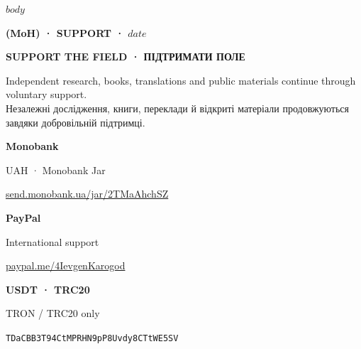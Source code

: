 \documentclass[10pt,a4paper]{article}
\begin{document}
\justifying
$body$
\clearpage
\thispagestyle{fancy}
{\fontsize{8}{10}\selectfont\bfseries\color{MoHMuted}(MoH) · SUPPORT · $date$\par}
\vspace{5mm}
{\fontsize{25}{28}\selectfont\bfseries\color{MoHInk}SUPPORT THE FIELD · ПІДТРИМАТИ ПОЛЕ\par}
\vspace{4mm}
{\fontsize{11}{15}\selectfont\color{MoHMuted}Independent research, books, translations and public materials continue through voluntary support.\\Незалежні дослідження, книги, переклади й відкриті матеріали продовжуються завдяки добровільній підтримці.\par}
\vspace{9mm}
\noindent\begin{minipage}[t]{0.30\linewidth}\centering
{\bfseries Monobank}\par\vspace{4mm}\color{black}\par\vspace{4mm}
{\fontsize{7.6}{10}\selectfont UAH · Monobank Jar\par}
{\fontsize{7.3}{9}\selectfont\href{https://send.monobank.ua/jar/2TMaAhchSZ}{send.monobank.ua/jar/2TMaAhchSZ}\par}
\end{minipage}\hfill
\begin{minipage}[t]{0.30\linewidth}\centering
{\bfseries PayPal}\par\vspace{4mm}\color{black}\par\vspace{4mm}
{\fontsize{7.6}{10}\selectfont International support\par}
{\fontsize{7.3}{9}\selectfont\href{https://www.paypal.me/4IevgenKarogod}{paypal.me/4IevgenKarogod}\par}
\end{minipage}\hfill
\begin{minipage}[t]{0.30\linewidth}\centering
{\bfseries USDT · TRC20}\par\vspace{4mm}\color{black}\par\vspace{4mm}
{\fontsize{7.6}{10}\selectfont TRON / TRC20 only\par}
{\fontsize{6.8}{8.5}\selectfont\texttt{TDaCBB3T94CtMPRHN9pP8Uvdy8CTtWE5SV}\par}
\end{minipage}
\end{document}

